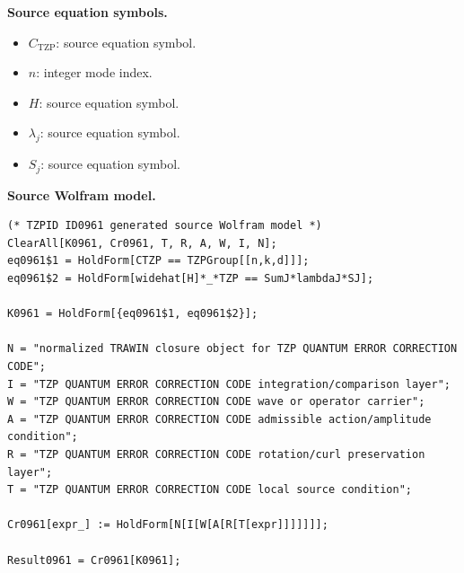 \begin{minipage}[t]{0.49\linewidth}
\begingroup
\small
\raggedright
\textbf{Source equation symbols.}\par
\begin{itemize}[leftmargin=1.35em,itemsep=1pt,topsep=1pt,parsep=0pt]
    \item $C_{\mathrm{TZP}}$: source equation symbol.
    \item $n$: integer mode index.
    \item $H$: source equation symbol.
    \item $\lambda_j$: source equation symbol.
    \item $S_j$: source equation symbol.
\end{itemize}
\endgroup
\end{minipage}\hfill
\begin{minipage}[t]{0.47\linewidth}
\begingroup
\scriptsize
\raggedright
\textbf{Source Wolfram model.}\par
\begin{Verbatim}[fontsize=\tiny,breaklines=true,breakanywhere=true]
(* TZPID ID0961 generated source Wolfram model *)
ClearAll[K0961, Cr0961, T, R, A, W, I, N];
eq0961$1 = HoldForm[CTZP == TZPGroup[[n,k,d]]];
eq0961$2 = HoldForm[widehat[H]*_*TZP == SumJ*lambdaJ*SJ];

K0961 = HoldForm[{eq0961$1, eq0961$2}];

N = "normalized TRAWIN closure object for TZP QUANTUM ERROR CORRECTION CODE";
I = "TZP QUANTUM ERROR CORRECTION CODE integration/comparison layer";
W = "TZP QUANTUM ERROR CORRECTION CODE wave or operator carrier";
A = "TZP QUANTUM ERROR CORRECTION CODE admissible action/amplitude condition";
R = "TZP QUANTUM ERROR CORRECTION CODE rotation/curl preservation layer";
T = "TZP QUANTUM ERROR CORRECTION CODE local source condition";

Cr0961[expr_] := HoldForm[N[I[W[A[R[T[expr]]]]]]];

Result0961 = Cr0961[K0961];
\end{Verbatim}
\endgroup
\end{minipage}

